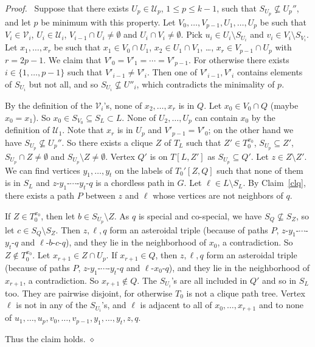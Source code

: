 \documentclass[11pt]{article}
\newenvironment{proofcl}{\noindent \emph{Proof.}\ }{Thus the claim
holds.  \hfill $\diamond$\vspace{1em}}
\begin{document}
\begin{proofcl}
Suppose that there exists $U_p\in \mathcal U_p$, $1\leq p\leq k-1$,
such that $S_{U_p}\nsubseteq U_p''$, and let $p$ be minimum with this
property.  Let $V_0, \ldots, V_{p-1}, U_1, \ldots, U_p$ be such that
$V_i\in\mathcal V_i$, $U_i\in\mathcal U_i$, $V_{i-1}\cap U_i \neq
\emptyset$ and $U_i\cap V_i\neq \emptyset$.  Pick $u_i\in U_i
\setminus S_{U_i}$ and $v_i \in V_i \setminus S_{V_i}$.  Let $x_1,
\ldots, x_r$ be such that $x_1\in V_0\cap U_1$, $x_2\in U_1\cap V_1$,
\ldots, $x_r \in V_{p-1}\cap U_p$ with $r=2p-1$.  We claim that $V'_0=
V'_1=\cdots=V'_{p-1}$.  For otherwise there exists $i\in\{1, \ldots,
p-1\}$ such that $V'_{i-1}\neq V'_i$.  Then one of $V'_{i-1}, V'_i$
contains elements of $S_{U_i}$ but not all, and so $S_{U_i}\nsubseteq
U''_i$, which contradicts the minimality of $p$.

By the definition of the $\mathcal V_i$'s, none of $x_2, \ldots, x_r$
is in $Q$.  Let $x_0\in V_0\cap Q$ (maybe $x_0=x_1$).  So $x_0\in
S_{V_0} \subseteq S_L\subset L$.  None of $U_2, \ldots, U_p$ can
contain $x_0$ by the definition of $\mathcal U_1$.  Note that $x_r$ is
in $U_p$ and $V'_{p-1}=V'_0$; on the other hand we have $S_{U_p}
\nsubseteq U_p''$.  So there exists a clique $Z$ of $T_L$ such that
$Z'\in T_0^{x_0}$, $S_{U_p}\subseteq Z'$, $S_{U_p}\cap Z\neq
\emptyset$ and $S_{U_p} \setminus Z\neq \emptyset$.  Vertex $Q'$ is on
$T[L, Z']$ as $S_{U_p}\subseteq Q'$.  Let $z\in Z \setminus Z'$.  We
can find vertices $y_1, \ldots, y_t$ on the labels of $T_0'[Z, Q]$
such that none of them is in $S_L$ and $z$-$y_1$-$\cdots$-$y_t$-$q$ is
a chordless path in $G$.  Let $\ell\in L\setminus S_L$.  By
Claim~\ref{clq}, there exists a path $P$ between $z$ and $\ell$ whose
vertices are not neighbors of $q$.

If $Z\in T_0^{x_0}$, then let $b\in S_{U_p}\setminus Z$.  As $q$ is
special and co-special, we have $S_Q\nsubseteq S_Z$, so let $c\in
S_Q\setminus S_Z$.  Then $z, \ell, q$ form an asteroidal triple
(because of paths $P$, $z$-$y_1$-$\cdots$-$y_t$-$q$ and
$\ell$-$b$-$c$-$q$), and they lie in the neighborhood of $x_0$, a
contradiction.  So $Z\notin T_0^{x_0}$.  Let $x_{r+1}\in Z\cap U_p$.
If $x_{r+1}\in Q$, then $z, \ell, q$ form an asteroidal triple
(because of paths $P$, $z$-$y_1$-$\cdots$-$y_t$-$q$ and
$\ell$-$x_0$-$q$), and they lie in the neighborhood of $x_{r+1}$, a
contradiction.  So $x_{r+1}\notin Q$.  The $S_{U_i}$'s are all
included in $Q'$ and so in $S_L$ too.  They are pairwise disjoint, for
otherwise $T_0$ is not a clique path tree.  Vertex $\ell$ is not in
any of the $S_{U_i}$'s, and $\ell$ is adjacent to all of $x_0, \ldots,
x_{r+1}$ and to none of $u_1, \ldots, u_p, v_0, \ldots, v_{p-1}, y_1,
\ldots, y_t, z, q$.


\end{proofcl}
\end{document}
